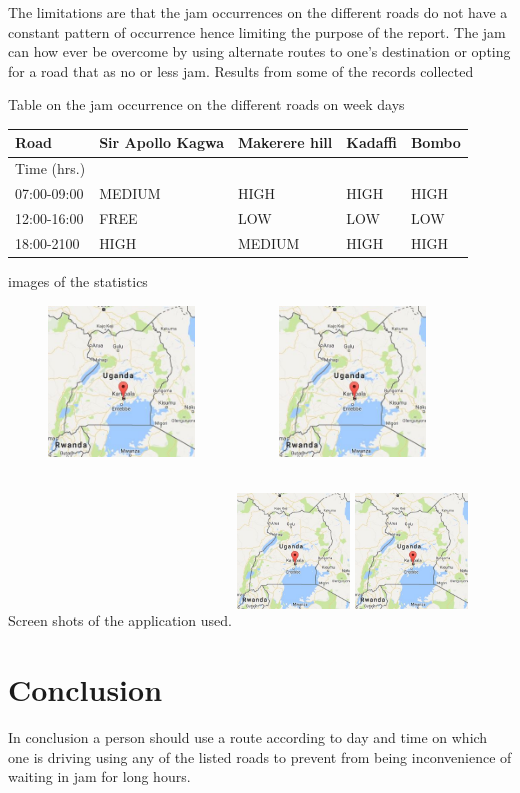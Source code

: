 \documentclass[options]{article}
\begin{document}
The limitations are that the jam occurrences on the different roads do not have a constant pattern of occurrence hence limiting the purpose of the report.
The jam can how ever be overcome by using alternate routes to one’s destination or opting for a road that as no or less jam.
Results from some of the records collected 


Table on the jam occurrence on the different roads on week days

\begin{tabular}{|l|l|l|l|l|}
\hline
Road& Sir Apollo Kagwa & Makerere hill & Kadaffi & Bombo \\
\hline
Time (hrs.) &  & & & \\
\hline
07:00-09:00& MEDIUM &HIGH&HIGH&HIGH \\
\hline
12:00-16:00 &FREE  & LOW&LOW & LOW\\
\hline
18:00-2100&HIGH  &MEDIUM & HIGH& HIGH\\
\hline

\end{tabular}
  
images of the statistics 

\includegraphics[width =6cm,height=4cm]{Captuhhre.JPG}
\includegraphics[width =6cm,height=4cm]{Captuhhre.JPG}

Screen shots of the application used.
\includegraphics[width =3cm,height=4cm]{Captuhhre.JPG}
\includegraphics[width =3cm,height=4cm]{Captuhhre.JPG}

\section{\textbf{Conclusion }} 
In conclusion a person should use a route according to day and time on which one is driving using any of the listed roads to prevent from being inconvenience of waiting in jam for long hours.
\end{document}
